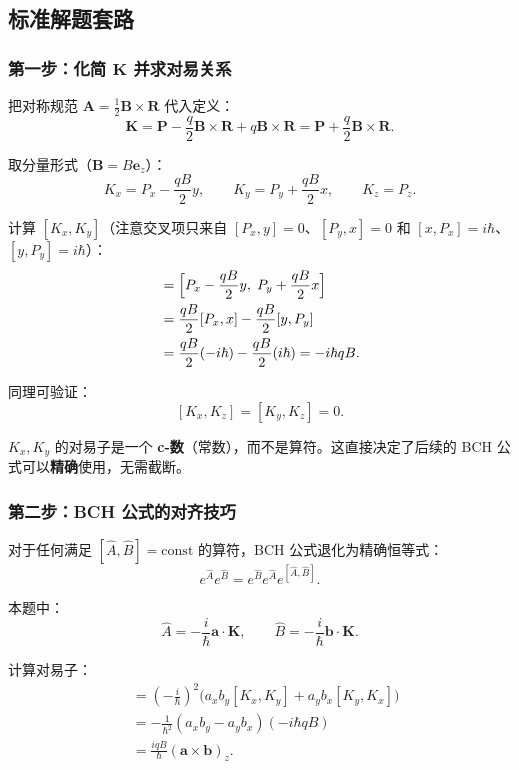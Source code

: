\subsection{标准解题套路}

\subsubsection{第一步：化简 $\bm{K}$ 并求对易关系}

把对称规范 $\bm{A} = \frac{1}{2}\bm{B} \times \bm{R}$ 代入定义：
\[
\bm{K} = \bm{P} - \frac{q}{2}\bm{B} \times \bm{R} + q\bm{B} \times \bm{R} = \bm{P} + \frac{q}{2}\bm{B} \times \bm{R}.
\]

取分量形式（$\bm{B} = B\bm{e}_z$）：
\[
K_x = P_x - \frac{qB}{2}y, \qquad K_y = P_y + \frac{qB}{2}x, \qquad K_z = P_z.
\]

计算 $[K_x, K_y]$（注意交叉项只来自 $[P_x, y] = 0$、$[P_y, x] = 0$ 和 $[x, P_x] = i\hbar$、$[y, P_y] = i\hbar$）：
\begin{align*}
[K_x, K_y] &= \Bigl[P_x - \frac{qB}{2}y,\; P_y + \frac{qB}{2}x\Bigr] \\
&= \frac{qB}{2}[P_x, x] - \frac{qB}{2}[y, P_y] \\
&= \frac{qB}{2}(-i\hbar) - \frac{qB}{2}(i\hbar) = -i\hbar qB.
\end{align*}

同理可验证：
\[
[K_x, K_z] = [K_y, K_z] = 0.
\]

\begin{tipbox}[考场速记]
$K_x, K_y$ 的对易子是一个 \textbf{c-数}（常数），而不是算符。这直接决定了后续的 BCH 公式可以\textbf{精确}使用，无需截断。
\end{tipbox}

\subsubsection{第二步：BCH 公式的对齐技巧}

对于任何满足 $[\hat{A}, \hat{B}] = \text{const}$ 的算符，BCH 公式退化为精确恒等式：
\[
\boxed{e^{\hat{A}} e^{\hat{B}} = e^{\hat{B}} e^{\hat{A}} e^{[\hat{A}, \hat{B}]}}.
\]

本题中：
\[
\hat{A} = -\frac{i}{\hbar} \bm{a} \cdot \bm{K}, \qquad \hat{B} = -\frac{i}{\hbar} \bm{b} \cdot \bm{K}.
\]

计算对易子：
\begin{align*}
[\hat{A}, \hat{B}]
&= \left(-\frac{i}{\hbar}\right)^2 \bigl(a_x b_y [K_x, K_y] + a_y b_x [K_y, K_x]\bigr) \\
&= -\frac{1}{\hbar^2} (a_x b_y - a_y b_x) (-i\hbar qB) \\
&= \frac{iqB}{\hbar} (\bm{a} \times \bm{b})_z.
\end{align*}

